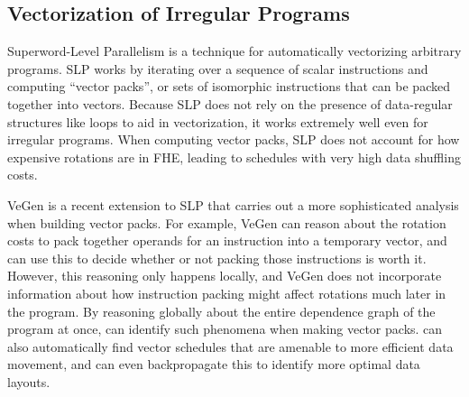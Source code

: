 \subsection{Vectorization of Irregular Programs}
Superword-Level Parallelism \cite{SLP} is a technique for automatically vectorizing arbitrary programs.
SLP works by iterating over a sequence of scalar instructions and computing ``vector packs'', or sets of isomorphic instructions that can be packed together into vectors.
Because SLP does not rely on the presence of data-regular structures like loops to aid in vectorization, it works extremely well even for irregular programs.
When computing vector packs, SLP does not account for how expensive rotations are in FHE, leading to schedules with very high data shuffling costs. 

VeGen \cite{VeGen} is a recent extension to SLP  that carries out a more sophisticated analysis when building vector packs.
For example, VeGen can reason about the rotation costs to pack together operands for an instruction into a temporary vector, and can use this to decide whether or not packing those instructions is worth it.
However, this reasoning only happens locally, and VeGen does not incorporate information about how instruction packing might affect rotations much later in the program.
By reasoning globally about the entire dependence graph of the program at once, \system can identify such phenomena when making vector packs.
\system can also automatically find vector schedules that are amenable to more efficient data movement, and can even backpropagate  this to identify more optimal data layouts.

